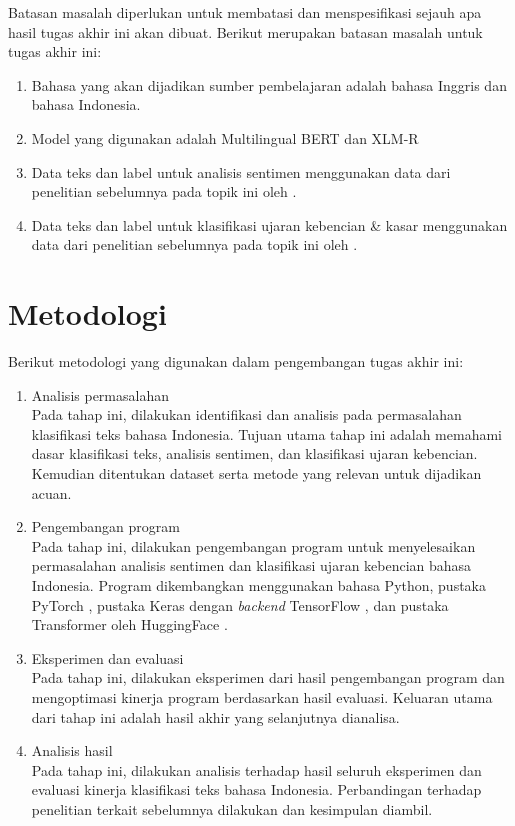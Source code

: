 Batasan masalah diperlukan untuk membatasi dan menspesifikasi sejauh apa hasil tugas akhir ini akan dibuat. Berikut merupakan batasan masalah untuk tugas akhir ini:
\begin{enumerate}
	\item Bahasa yang akan dijadikan sumber pembelajaran adalah bahasa Inggris dan bahasa Indonesia.
	\item Model yang digunakan adalah Multilingual BERT \parencite{Devlin_Chang_Lee_Toutanova_2019} dan XLM-R \parencite{Conneau_XLMR}
	\item Data teks dan label untuk analisis sentimen menggunakan data dari penelitian sebelumnya pada topik ini oleh \parencite{CrisdayantiPurwarianti2019}.
	\item Data teks dan label untuk klasifikasi ujaran kebencian \& kasar menggunakan data dari penelitian sebelumnya pada topik ini oleh \parencite{Ibrohim_Budi_2019}.
\end{enumerate}

\section{Metodologi}

Berikut metodologi yang digunakan dalam pengembangan tugas akhir ini:
\begin{enumerate}
	\item Analisis permasalahan \\
	Pada tahap ini, dilakukan identifikasi dan analisis pada permasalahan klasifikasi teks bahasa Indonesia. Tujuan utama tahap ini adalah memahami dasar klasifikasi teks, analisis sentimen, dan klasifikasi ujaran kebencian. Kemudian ditentukan dataset serta metode yang relevan untuk dijadikan acuan.

	\item Pengembangan program \\
	Pada tahap ini, dilakukan pengembangan program untuk menyelesaikan permasalahan analisis sentimen dan klasifikasi ujaran kebencian bahasa Indonesia. Program dikembangkan menggunakan bahasa Python, pustaka PyTorch \parencite{paszke2017automatic}, pustaka Keras \parencite{chollet2015keras} dengan \textit{backend} TensorFlow \parencite{tensorflow2015}, dan pustaka Transformer oleh HuggingFace \parencite{Wolf_Debut_Sanh_Chaumond_Delangue_Moi_Cistac_Rault_Louf_Funtowicz}.

	\item Eksperimen dan evaluasi \\
	Pada tahap ini, dilakukan eksperimen dari hasil pengembangan program dan mengoptimasi kinerja program berdasarkan hasil evaluasi. Keluaran utama dari tahap ini adalah hasil akhir yang selanjutnya dianalisa.
	
	\item Analisis hasil \\
	Pada tahap ini, dilakukan analisis terhadap hasil seluruh eksperimen dan evaluasi kinerja klasifikasi teks bahasa Indonesia. Perbandingan terhadap penelitian terkait sebelumnya dilakukan dan kesimpulan diambil.


\end{enumerate}

